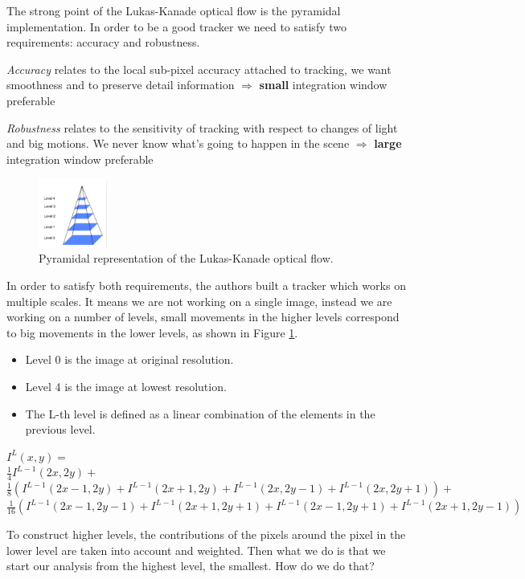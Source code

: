 The strong point of the Lukas-Kanade optical flow is the pyramidal implementation. In order to be a good tracker we need to satisfy two requirements: accuracy and robustness.

\textit{Accuracy} relates to the local sub-pixel accuracy attached to tracking, we want smoothness and to preserve detail information $\Rightarrow$ \textbf{small} integration window preferable

\textit{Robustness} relates to the sensitivity of tracking with respect to changes of light and big motions. We never know what's going to happen in the scene $\Rightarrow$ \textbf{large} integration window preferable

\begin{figure}[H]
    \centering
    \includegraphics[width=0.2\textwidth]{Figures/pyramid.png}
    \caption{Pyramidal representation of the Lukas-Kanade optical flow.}
    \label{img:pyramid}
\end{figure}

In order to satisfy both requirements, the authors built a tracker which works on multiple scales. It means we are not working on a single image, instead we are working on a number of levels, small movements in the higher levels correspond to big movements in the lower levels, as shown in Figure \ref{img:pyramid}.

\begin{itemize}
    \item Level 0 is the image at original resolution.
    \item Level 4 is the image at lowest resolution.
    \item The L-th level is defined as a linear combination of the elements in the previous level.
\end{itemize}
\(
    I^L(x,y) = 
\)\\
\(
    \frac{1}{4}I^{L-1}(2x, 2y)+
\)\\
\(
    \frac{1}{8}(I^{L-1}(2x-1,2y) + I^{L-1}(2x+1,2y)+I^{L-1}(2x,2y-1)+I^{L-1}(2x,2y+1))+    
\)\\
\(
    \frac{1}{16}(I^{L-1}(2x-1,2y-1) + I^{L-1}(2x+1,2y+1)+I^{L-1}(2x-1,2y+1)+I^{L-1}(2x+1,2y-1))    
\)

To construct higher levels, the contributions of the pixels around the pixel in the lower level are taken into account and weighted. Then what we do is that we start our analysis from the highest level, the smallest. How do we do that?


